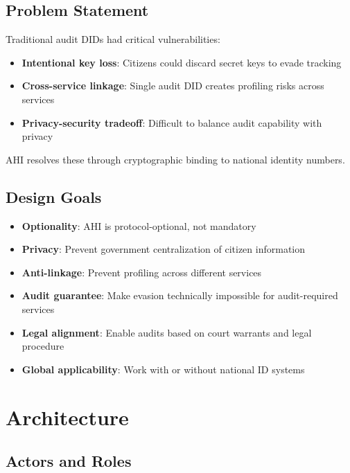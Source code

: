 \subsection{Problem Statement}

Traditional audit DIDs had critical vulnerabilities:

\begin{itemize}
  \item \textbf{Intentional key loss}: Citizens could discard secret keys to evade tracking
  \item \textbf{Cross-service linkage}: Single audit DID creates profiling risks across services
  \item \textbf{Privacy-security tradeoff}: Difficult to balance audit capability with privacy
\end{itemize}

AHI resolves these through cryptographic binding to national identity numbers.

\subsection{Design Goals}

\begin{itemize}
  \item \textbf{Optionality}: AHI is protocol-optional, not mandatory
  \item \textbf{Privacy}: Prevent government centralization of citizen information
  \item \textbf{Anti-linkage}: Prevent profiling across different services
  \item \textbf{Audit guarantee}: Make evasion technically impossible for audit-required services
  \item \textbf{Legal alignment}: Enable audits based on court warrants and legal procedure
  \item \textbf{Global applicability}: Work with or without national ID systems
\end{itemize}

\section{Architecture}

\subsection{Actors and Roles}

